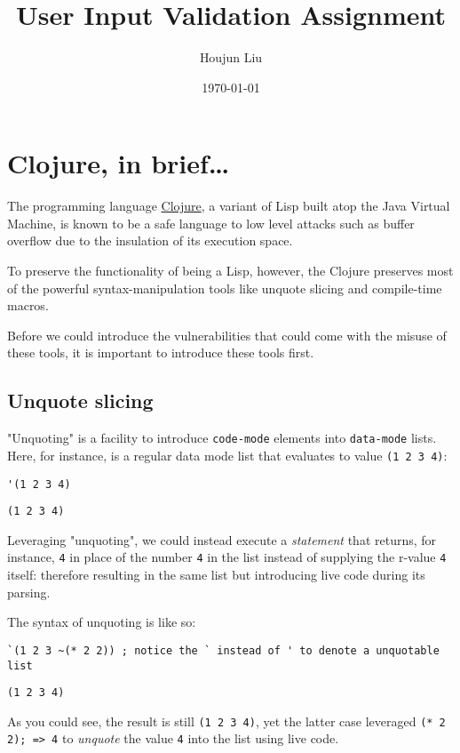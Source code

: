 \documentclass[letterpaper]{article}
\author{Houjun Liu}
\date{\today}
\title{User Input Validation Assignment}
\renewcommand{\tableofcontents}{}
\begin{document}
\tableofcontents


\section{Clojure, in brief\ldots{}}
\label{sec:orgf3562db}
The programming language \href{https://clojure.org/}{Clojure}, a variant of Lisp built atop the Java Virtual Machine, is known to be a safe language to low level attacks such as buffer overflow due to the insulation of its execution space.

To preserve the functionality of being a Lisp, however, the Clojure preserves most of the powerful syntax-manipulation tools like unquote slicing and compile-time macros.

Before we could introduce the vulnerabilities that could come with the misuse of these tools, it is important to introduce these tools first.

\subsection{Unquote slicing}
\label{sec:orgb8a7ca4}
"Unquoting" is a facility to introduce \texttt{code-mode} elements into \texttt{data-mode} lists. Here, for instance, is a regular data mode list that evaluates to value \texttt{(1 2 3 4)}:

\begin{verbatim}
'(1 2 3 4)
\end{verbatim}

\begin{verbatim}
(1 2 3 4)
\end{verbatim}


Leveraging "unquoting", we could instead execute a \emph{statement} that returns, for instance, \texttt{4} in place of the number \texttt{4} in the list instead of supplying the r-value \texttt{4} itself: therefore resulting in the same list but introducing live code during its parsing.

The syntax of unquoting is like so:

\begin{verbatim}
`(1 2 3 ~(* 2 2)) ; notice the ` instead of ' to denote a unquotable list
\end{verbatim}

\begin{verbatim}
(1 2 3 4)
\end{verbatim}


As you could see, the result is still \texttt{(1 2 3 4)}, yet the latter case leveraged \texttt{(* 2 2); => 4} to \emph{unquote} the value \texttt{4} into the list using live code.
\end{document}
